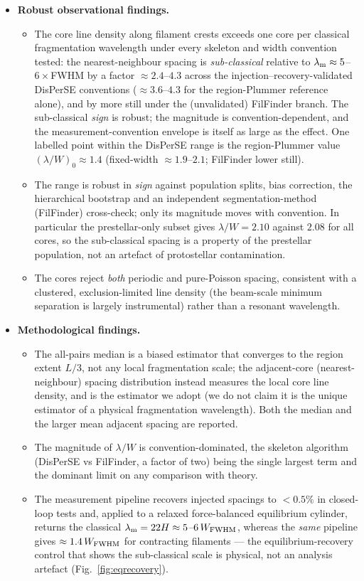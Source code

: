\documentclass[usenatbib,twoside,twocolumn]{mnras}
\begin{document}
\begin{itemize}
    \item \textbf{Robust observational findings.}
    \begin{itemize}
        \item The core line density along filament crests exceeds one core per classical fragmentation wavelength under every skeleton and width convention tested: the nearest-neighbour spacing is \emph{sub-classical} relative to $\lambda_{\rm m}\approx5$--$6\times$FWHM by a factor $\approx2.4$--$4.3$ across the injection--recovery-validated DisPerSE conventions ($\approx3.6$--$4.3$ for the region-Plummer reference alone), and by more still under the (unvalidated) FilFinder branch. The sub-classical \emph{sign} is robust; the magnitude is convention-dependent, and the measurement-convention envelope is itself as large as the effect. One labelled point within the DisPerSE range is the region-Plummer value $(\lambda/W)_0\approx1.4$ (fixed-width $\approx1.9$--$2.1$; FilFinder lower still).
        \item The range is robust in \emph{sign} against population splits, bias correction, the hierarchical bootstrap and an independent segmentation-method (FilFinder) cross-check; only its magnitude moves with convention. In particular the prestellar-only subset gives $\lambda/W=2.10$ against $2.08$ for all cores, so the sub-classical spacing is a property of the prestellar population, not an artefact of protostellar contamination.
        \item The cores reject \emph{both} periodic and pure-Poisson spacing, consistent with a clustered, exclusion-limited line density (the beam-scale minimum separation is largely instrumental) rather than a resonant wavelength.
    \end{itemize}

    \item \textbf{Methodological findings.}
    \begin{itemize}
        \item The all-pairs median is a biased estimator that converges to the region extent $L/3$, not any local fragmentation scale; the adjacent-core (nearest-neighbour) spacing distribution instead measures the local core line density, and is the estimator we adopt (we do not claim it is the unique estimator of a physical fragmentation wavelength). Both the median and the larger mean adjacent spacing are reported.
        \item The magnitude of $\lambda/W$ is convention-dominated, the skeleton algorithm (DisPerSE vs FilFinder, a factor of two) being the single largest term and the dominant limit on any comparison with theory.
        \item The measurement pipeline recovers injected spacings to $<0.5\%$ in closed-loop tests and, applied to a relaxed force-balanced equilibrium cylinder, returns the classical $\lambda_{\rm m}=22H\approx5$--$6\,W_{\rm FWHM}$, whereas the \emph{same} pipeline gives $\approx1.4\,W_{\rm FWHM}$ for contracting filaments --- the equilibrium-recovery control that shows the sub-classical scale is physical, not an analysis artefact (Fig.~\ref{fig:eqrecovery}).
    \end{itemize}


\end{itemize}
\end{document}
